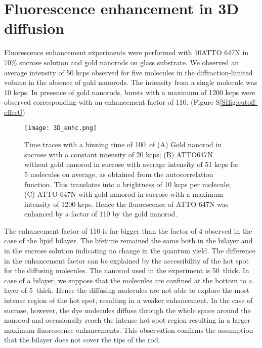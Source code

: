 \section{Fluorescence enhancement in 3D diffusion}
Fluorescence enhancement experiments were performed with 10\nM ATTO 647N in 70\% sucrose solution and gold nanorods on glass substrate. We observed an average intensity of 50 kcps observed for five molecules in the diffraction-limited volume in the absence of gold nanorods. The intensity from a single molecule was 10 kcps. In presence of gold nanorods, bursts with a maximum of 1200 kcps were observed corresponding with an enhancement factor of 110. (Figure S\ref{SIfig:cutoff-effect})\\
\begin{figure}[ht]
  \centering
  \texttt{[image: 3D\_enhc.png]}
  \makeatletter
  \renewcommand{\fnum@figure}{\figurename~S\thefigure}
  \makeatother{}
  \caption{Time traces with a binning time of 100~\us of (A) Gold nanorod in sucrose with a constant intensity of 20 kcps; (B) ATTO647N without gold nanorod in sucrose with average intensity of 51 kcps for 5 molecules on average, as obtained from the autocorrelation function. This translates into a brightness of 10 kcps per molecule; (C) ATTO 647N with gold nanorod in sucrose with a maximum intensity of 1200 kcps. Hence the fluorescence of ATTO 647N was enhanced by a factor of 110 by the gold nanorod.}
  \label{SIfig:3D-enhc}
\end{figure}
The enhancement factor of 110 is far bigger than the factor of 4 observed in the case of the lipid bilayer. The lifetime remained the same both in the bilayer and in the sucrose solution indicating no change in the quantum yield. The difference in the enhancement factor can be explained by the accessibility of the hot spot for the diffusing molecules. The nanorod used in the experiment is 50~\nm thick. In case of a bilayer, we suppose that the molecules are confined at the bottom to a layer of 5~\nm thick. Hence the diffusing molecules are not able to explore the most intense region of the hot spot, resulting in a weaker enhancement. In the case of sucrose, however, the dye molecules diffuse through the whole space around the nanorod and occasionally reach the intense hot spot region resulting in a larger maximum fluorescence enhancements. This observation confirms the assumption that the bilayer does not cover the tips of the rod.\\
\newpage
